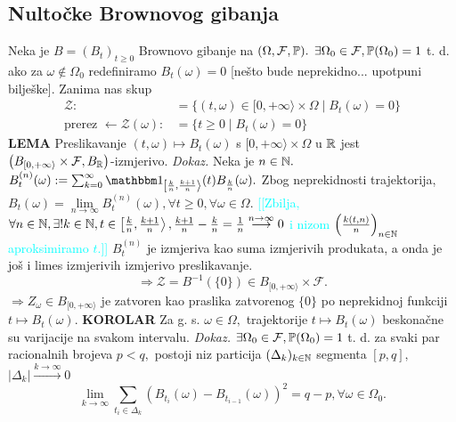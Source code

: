 \documentclass{article}
\begin{document}
\subsection{Nultočke Brownovog gibanja}
Neka je \(B=(B_t)_{t\ge0}\) Brownovo gibanje na \((\Omega,\mathcal F,\Bbb P).\) \(\exists\Omega_0\in\mathcal F,\Bbb P(\Omega_0)=1\) t. d. ako za \(\omega\notin\Omega_0\) redefiniramo  \(B_t(\omega)=0\) [nešto bude neprekidno... upotpuni bilješke]. Zanima nas skup \[\begin{aligned}\mathcal Z:&=\{(t,\omega)\in[0,+\infty\rangle\times\Omega\mid B_t(\omega)=0\}\\\text{prerez }\leftarrow\mathcal Z(\omega):&=\{t\ge0\mid B_t(\omega)=0\}\end{aligned}\]
\textbf{LEMA}\newline
Preslikavanje \((t,\omega)\mapsto B_t(\omega)\) s \([0,+\infty\rangle\times\Omega\) u \(\Bbb R\) jest \(\left(B_{[0,+\infty\rangle}\times\mathcal F, B_\Bbb R\right)\)-izmjerivo.\newline\newline
\textit{Dokaz.}\newline 
Neka je \(n\in\Bbb N.\) \(B_t^{(n)}(\omega):=\sum_{k=0}^\infty\mathbbm 1_{\left[\frac{k}n,\frac{k+1}n\right\rangle}(t)B_{\frac{k}n}(\omega).\) Zbog neprekidnosti trajektorija, \(B_t(\omega)=\lim\limits_{n\to\infty}B_t^{(n)}(\omega),\forall t\ge0,\forall\omega\in\Omega.\) \textcolor{Cyan}{[[Zbilja, \(\forall n\in\Bbb N,\exists! k\in\Bbb N,t\in\left[\frac{k}n,\frac{k+1}n\right\rangle,\frac{k+1}n-\frac{k}n=\frac1n\overset{n\to\infty}{\longrightarrow}0\) i nizom \(\left(\frac{k(t,n)}n\right)_{n\in\Bbb N}\) aproksimiramo \(t.\)]]} \(B_t^{(n)}\) je izmjeriva kao suma izmjerivih produkata, a onda je još i limes izmjerivih izmjerivo preslikavanje. \[\Rightarrow\mathcal Z= B^{-1}(\{0\})\in B_{[0,+\infty\rangle}\times\mathcal F.\] \(\Rightarrow Z_\omega\in B_{[0,+\infty\rangle}\) je zatvoren kao praslika zatvorenog \(\{0\}\) po neprekidnoj funkciji  \(t\mapsto B_t(\omega).\)\newline\newline
\textbf{KOROLAR}\newline
Za g. s. \(\omega\in\Omega,\) trajektorije \(t\mapsto B_t(\omega)\) beskonačne su varijacije na svakom intervalu.\newline\newline
\textit{Dokaz.}\newline
\(\exists\Omega_0\in\mathcal F,\Bbb P(\Omega_0)=1\) t. d. za svaki par racionalnih brojeva \(p<q,\) postoji niz particija \((\Delta_k)_{k\in\Bbb N}\) segmenta \([p,q],\) \(|\Delta_k|\overset{k\to\infty}{\longrightarrow}0\) \[\lim_{k\to\infty}\sum_{t_i\in\Delta_k}\left(B_{t_i}(\omega)-B_{t_{i-1}}(\omega)\right)^2=q-p,\forall\omega\in\Omega_0.\] 
\end{document}
